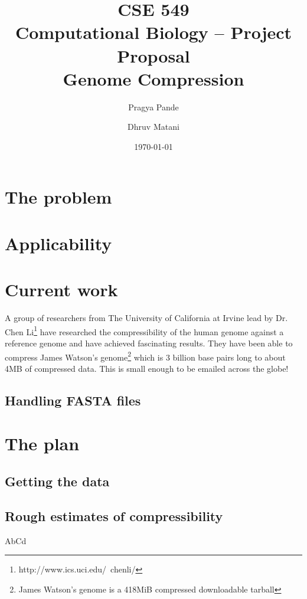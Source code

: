 \documentclass[11pt,twocolumn]{article}
\begin{document}
\title{CSE 549\\Computational Biology -- Project Proposal\\Genome Compression}
\author{Pragya Pande \and Dhruv Matani}
\date{\today}

\maketitle

\vspace{0.5in}

\section*{The problem}

\section*{Applicability}


\section*{Current work}

A group of researchers from The University of California at Irvine
lead by Dr. Chen Li\footnote{http://www.ics.uci.edu/~chenli/} have
researched the compressibility of the human genome against a reference
genome and have achieved fascinating results. They have been able to
compress James Watson's genome\footnote{James Watson's genome is a
  418MiB compressed downloadable tarball} which is 3 billion base
pairs long to about 4MB of compressed data. This is small enough to be
emailed across the globe!\cite{xyz}


\subsection*{Handling FASTA files}

\subsection*{}

\section*{The plan}

\subsection*{Getting the data}

\subsection*{Rough estimates of compressibility}

\begin{thebibliography}{9}

AbCd

\end{thebibliography}
\end{document}
